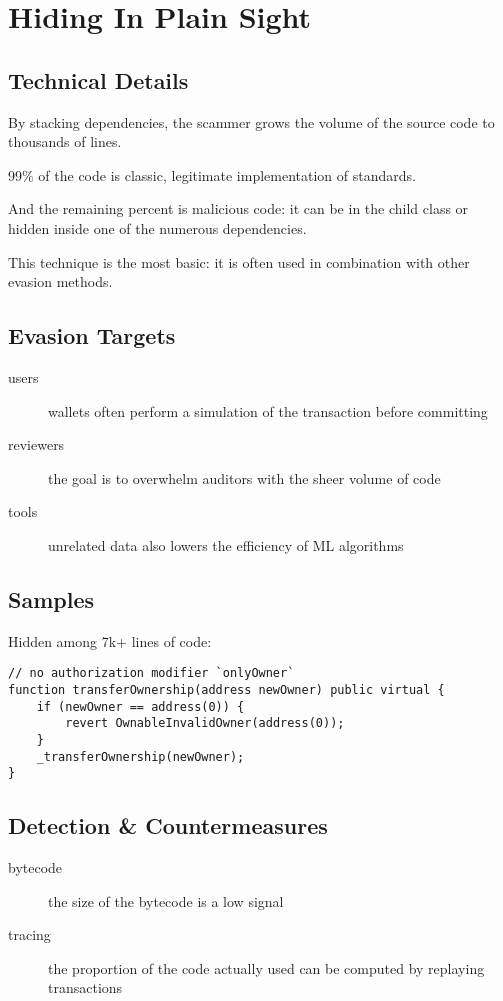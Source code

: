 \section{Hiding In Plain Sight} \label{sec:hiding-in-plain-sight}

\subsection{Technical Details}

By stacking dependencies, the scammer grows the volume of the source code to thousands of lines.

99\% of the code is classic, legitimate implementation of standards.

And the remaining percent is malicious code: it can be in the child class or hidden inside one of the numerous dependencies.

This technique is the most basic: it is often used in combination with other evasion methods.

\subsection{Evasion Targets}

\begin{description}
\item[users]{wallets often perform a simulation of the transaction before committing}
\item[reviewers]{the goal is to overwhelm auditors with the sheer volume of code}
\item[tools]{unrelated data also lowers the efficiency of ML algorithms}
\end{description}

\subsection{Samples}

Hidden among 7k+ lines of code:

\begin{lstlisting}[language=Solidity]
// no authorization modifier `onlyOwner`
function transferOwnership(address newOwner) public virtual {
    if (newOwner == address(0)) {
        revert OwnableInvalidOwner(address(0));
    }
    _transferOwnership(newOwner);
}
\end{lstlisting}

\subsection{Detection \& Countermeasures}

\begin{description}
\item[bytecode]{the size of the bytecode is a low signal}
\item[tracing]{the proportion of the code actually used can be computed by replaying transactions}
\end{description}
